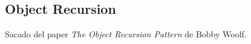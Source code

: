 \subsection{Object Recursion}

Sacado del paper \emph{The Object Recursion Pattern} de Bobby Woolf. 